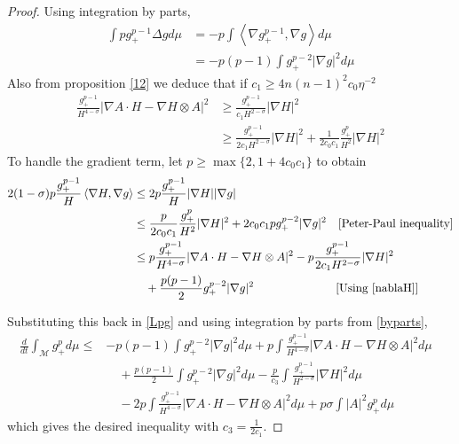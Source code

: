 \begin{proof}
    Using integration by parts, 
    \begin{align}
        \int pg_{+}^{p-1} \Delta g d \mu & = - p\int \left< \nabla g_{+}^{p-1}, \nabla g \right> d \mu \\
        & = -p(p-1) \int g_{+}^{p-2}| \nabla g|^{2} d \mu \label{byparts}
    \end{align}
    Also from proposition \cref{12} we deduce that if $ c_{1} \ge 4 n(n-1)^{2}c_{0} \eta^{-2} $ 
    \begin{align}
        \frac{g_{+}^{p-1}}{H^{4-\sigma}}|\nabla A \cdot H - \nabla H \otimes A|^{2} &\ge \frac{g_{+}^{p-1}}{c_{1}H^{2-\sigma}}| \nabla H|^{2} \nonumber\\
        & \ge \frac{g_{+}^{p-1}}{2c_{1}H^{2-\sigma}}| \nabla H|^{2} + \frac{1}{2c_{0}c_{1}} \frac{g_{+}^{p}}{H^{2}}| \nabla H|^{2} \label{nablaH}
    \end{align}
    To handle the gradient term, let $ p \ge \max \{2,1+4c_{0}c_{1} \} $ to obtain \begin{align*}
        2(1-\sigma)p \frac{g_{+}^{p-1}}{H} \left< \nabla H, \nabla g \right> & \le 2p \frac{g_{+}^{p-1}}{H} |\nabla H| |\nabla g| \\
        & \le \frac{p}{2c_{0}c_{1}} \frac{g_{+}^{p}}{H^{2}}|\nabla H|^{2} + 2c_{0}c_{1}pg_{+}^{p-2}|\nabla g|^{2} \quad [\text{Peter-Paul inequality}] \\
        & \le p \frac{g_{+}^{p-1}}{H^{4-\sigma}}|\nabla A \cdot H - \nabla H \otimes A|^{2} - p \frac{g_{+}^{p-1}}{2c_{1}H^{2-\sigma}}|\nabla H|^{2} \\
        & \quad + \frac{p(p-1)}{2}g_{+}^{p-2}|\nabla g|^{2} \qquad \qquad\quad  \qquad[\text{Using \cref{nablaH}}]
    \end{align*}

    Substituting this back in \cref{Lpg} and using integration by parts from \cref{byparts}, \begin{align*}
        \frac{d}{dt} \int_{ \mathcal{M}} g_{+}^{p} d \mu \le & -p(p-1)\int g_{+}^{p-2}|\nabla g|^{2} d \mu + p \int \frac{g_{+}^{p-1}}{H^{4-\sigma}}|\nabla A \cdot H - \nabla H \otimes A|^{2}d \mu & \\
        & \quad + \frac{p(p-1)}{2}\int g_{+}^{p-2}|\nabla g|^{2}d \mu - \frac{p}{c_{3}} \int \frac{g_{+}^{p-1}}{H^{2-\sigma}}|\nabla H|^{2} d \mu \\
        & \quad - 2p \int \frac{g_{+}^{p-1}}{H^{4-\sigma}}|\nabla A \cdot H - \nabla H \otimes A|^{2}d \mu + p \sigma \int |A|^{2}g_{+}^{p}d \mu
    \end{align*}
    which gives the desired inequality with $ c_{3} = \frac{1}{2c_{1}} $.
\end{proof}
